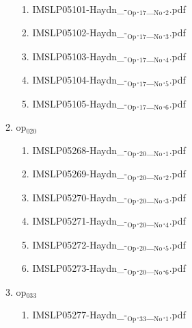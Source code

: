 \documentclass[11pt]{article}
\begin{document}
\begin{enumerate}
\begin{enumerate}
\begin{enumerate}
\item IMSLP05101-Haydn\_-$_{\text{Op}}$.$_{\text{17}}$\_$_{\text{No}}$.$_{\text{2}}$.pdf
\label{sec-1-1-1-1-44-38-6-5-2}

\item IMSLP05102-Haydn\_-$_{\text{Op}}$.$_{\text{17}}$\_$_{\text{No}}$.$_{\text{3}}$.pdf
\label{sec-1-1-1-1-44-38-6-5-3}

\item IMSLP05103-Haydn\_-$_{\text{Op}}$.$_{\text{17}}$\_$_{\text{No}}$.$_{\text{4}}$.pdf
\label{sec-1-1-1-1-44-38-6-5-4}

\item IMSLP05104-Haydn\_-$_{\text{Op}}$.$_{\text{17}}$\_$_{\text{No}}$.$_{\text{5}}$.pdf
\label{sec-1-1-1-1-44-38-6-5-5}

\item IMSLP05105-Haydn\_-$_{\text{Op}}$.$_{\text{17}}$\_$_{\text{No}}$.$_{\text{6}}$.pdf
\label{sec-1-1-1-1-44-38-6-5-6}
\end{enumerate}

\item op$_{\text{020}}$
\label{sec-1-1-1-1-44-38-6-6}
\begin{enumerate}
\item IMSLP05268-Haydn\_-$_{\text{Op}}$.$_{\text{20}}$\_$_{\text{No}}$.$_{\text{1}}$.pdf
\label{sec-1-1-1-1-44-38-6-6-1}

\item IMSLP05269-Haydn\_-$_{\text{Op}}$.$_{\text{20}}$\_$_{\text{No}}$.$_{\text{2}}$.pdf
\label{sec-1-1-1-1-44-38-6-6-2}

\item IMSLP05270-Haydn\_-$_{\text{Op}}$.$_{\text{20}}$\_$_{\text{No}}$.$_{\text{3}}$.pdf
\label{sec-1-1-1-1-44-38-6-6-3}

\item IMSLP05271-Haydn\_-$_{\text{Op}}$.$_{\text{20}}$\_$_{\text{No}}$.$_{\text{4}}$.pdf
\label{sec-1-1-1-1-44-38-6-6-4}

\item IMSLP05272-Haydn\_-$_{\text{Op}}$.$_{\text{20}}$\_$_{\text{No}}$.$_{\text{5}}$.pdf
\label{sec-1-1-1-1-44-38-6-6-5}

\item IMSLP05273-Haydn\_-$_{\text{Op}}$.$_{\text{20}}$\_$_{\text{No}}$.$_{\text{6}}$.pdf
\label{sec-1-1-1-1-44-38-6-6-6}
\end{enumerate}

\item op$_{\text{033}}$
\label{sec-1-1-1-1-44-38-6-7}
\begin{enumerate}
\item IMSLP05277-Haydn\_-$_{\text{Op}}$.$_{\text{33}}$\_$_{\text{No}}$.$_{\text{1}}$.pdf
\label{sec-1-1-1-1-44-38-6-7-1}


\end{enumerate}
\end{enumerate}
\end{enumerate}
\end{document}
